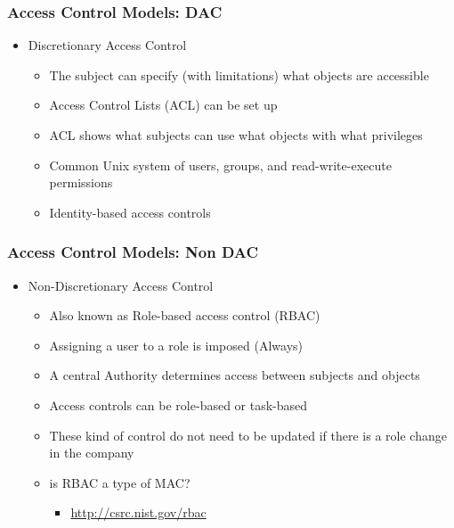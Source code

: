 \documentclass{beamer}
\begin{document}
\begin{frame}
\frametitle{Access Control Models: DAC}

\begin{itemize}
\item Discretionary Access Control
    \begin{itemize}
    \item The subject can specify (with limitations) what objects are accessible
    \item Access Control Lists (ACL) can be set up
    \item ACL shows what subjects can use what objects with what privileges
    \item Common Unix system of users, groups, and read-write-execute permissions
    \item Identity-based access controls
    \end{itemize}
\end{itemize}
\end{frame}



\begin{frame}
\frametitle{Access Control Models: Non DAC}

\begin{itemize}
 
\item Non-Discretionary Access Control
    \begin{itemize}
    \item Also known as Role-based access control (RBAC)
    \item Assigning a user to a role is imposed (Always)
    \item A central Authority determines access between subjects and objects
    \item Access controls can be role-based or task-based
    \item These kind of control do not need to be updated if there is a role change in the company
    \item is RBAC a type of MAC?
       \begin{itemize}
       \item \url{http://csrc.nist.gov/rbac}
       \end{itemize}
    \end{itemize}

\end{itemize}
\end{frame}
\end{document}
